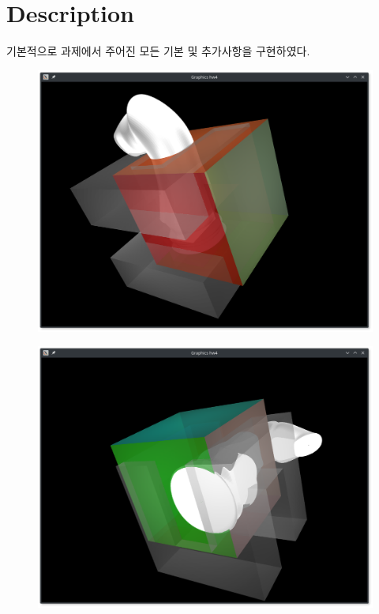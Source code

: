 \documentclass[11pt]{oblivoir}
\begin{document}
\section{Description}
기본적으로 과제에서 주어진 모든 기본 및 추가사항을 구현하였다.
\begin{figure}[H]
  \centering
  \includegraphics[width=0.75\linewidth]{image1.png}
\end{figure}
\begin{figure}[H]
  \centering
  \includegraphics[width=0.75\linewidth]{image2.png}
\end{figure}
\end{document}

